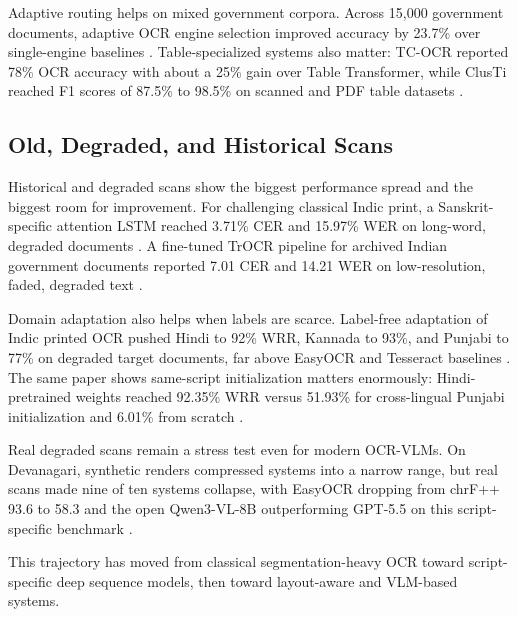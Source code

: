     
    Adaptive routing helps on mixed government corpora. Across 15,000 government documents, adaptive OCR engine selection improved accuracy by 23.7\% over single-engine baselines  \cite{Zhang2026Adaptive}. Table-specialized systems also matter: TC-OCR reported 78\% OCR accuracy with about a 25\% gain over Table Transformer, while ClusTi reached F1 scores of 87.5\% to 98.5\% on scanned and PDF table datasets  \cite{Anand2023TC-OCR:} \cite{Zucker2021ClusTi:}.
    
    
    \subsection*{Old, Degraded, and Historical Scans}
    
    
    Historical and degraded scans show the biggest performance spread and the biggest room for improvement. For challenging classical Indic print, a Sanskrit-specific attention LSTM reached 3.71\% CER and 15.97\% WER on long-word, degraded documents  \cite{Dwivedi2020An}. A fine-tuned TrOCR pipeline for archived Indian government documents reported 7.01 CER and 14.21 WER on low-resolution, faded, degraded text  \cite{Meghana2025Enhanced}.
    
    
    Domain adaptation also helps when labels are scarce. Label-free adaptation of Indic printed OCR pushed Hindi to 92\% WRR, Kannada to 93\%, and Punjabi to 77\% on degraded target documents, far above EasyOCR and Tesseract baselines  \cite{Manna2025Label-Free}. The same paper shows same-script initialization matters enormously: Hindi-pretrained weights reached 92.35\% WRR versus 51.93\% for cross-lingual Punjabi initialization and 6.01\% from scratch  \cite{Manna2025Label-Free}.
    
    
    Real degraded scans remain a stress test even for modern OCR-VLMs. On Devanagari, synthetic renders compressed systems into a narrow range, but real scans made nine of ten systems collapse, with EasyOCR dropping from chrF++ 93.6 to 58.3 and the open Qwen3-VL-8B outperforming GPT-5.5 on this script-specific benchmark  \cite{Singh2026Can}.
    
    
    This trajectory has moved from classical segmentation-heavy OCR toward script-specific deep sequence models, then toward layout-aware and VLM-based systems.
    
